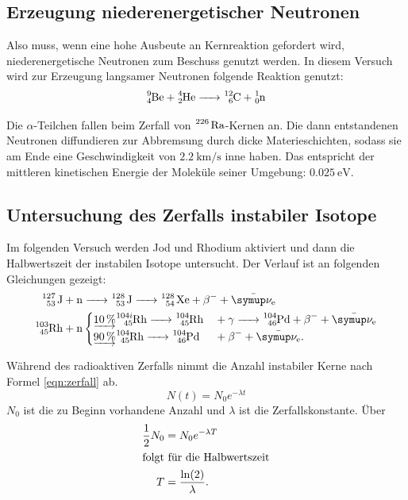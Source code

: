 \subsection{Erzeugung niederenergetischer Neutronen}

Also muss, wenn eine hohe Ausbeute an Kernreaktion gefordert wird, niederenergetische
Neutronen zum Beschuss genutzt werden.
In diesem Versuch wird zur Erzeugung langsamer Neutronen folgende Reaktion
genutzt:
\begin{equation*}
  \ce{^9_4Be + ^4_2He -> ^12_6C + ^1_0n}
\end{equation*}

Die $\alpha$-Teilchen fallen beim Zerfall von $\ce{^226 Ra}$-Kernen an.
Die dann entstandenen Neutronen diffundieren zur Abbremsung durch dicke
Materieschichten, sodass sie am Ende eine Geschwindigkeit von $\SI{2.2}{\kilo\meter\per\second}$
inne haben. Das entspricht der mittleren kinetischen Energie der Moleküle
seiner Umgebung: $\SI{0.025}{\electronvolt}$.

\subsection{Untersuchung des Zerfalls instabiler Isotope}

Im folgenden Versuch werden Jod und Rhodium aktiviert und dann die Halbwertszeit
der instabilen Isotope untersucht. Der Verlauf ist an folgenden Gleichungen
gezeigt:
\begin{align}
  \ce{^127_53 J + n&-> ^128_53 J -> ^128_54 Xe + \beta^- + \bar{\g{\nu}_e}}\\
  \ce{^103_45Rh + n&}
  \begin{cases}
    \underrightarrow{\SI{10}{\percent}} \ce{^{104i}_45Rh -> ^104_45Rh &+ \text{$\gamma$} -> ^104_46Pd + \beta^- + \bar{\g{\nu}_e}}\\
    \underrightarrow{\SI{90}{\percent}} \ce{^104_45Rh -> ^104_46Pd &+ \beta^- + \bar{\g{\nu}_e}}.
  \end{cases}\label{eqn:zerfrho}
\end{align}

Während des radioaktiven Zerfalls nimmt die Anzahl instabiler Kerne nach
Formel \eqref{eqn:zerfall} ab.
\begin{equation}
  N(t) = N_0 e^{-\lambda t}
  \label{eqn:zerfall}
\end{equation}
$N_0$ ist die zu Beginn vorhandene Anzahl und $\lambda$ ist die Zerfallskonstante.
Über
\begin{align}
  \frac{1}{2} N_0 &= N_0 e^{-\lambda T}\\
  \intertext{folgt für die Halbwertszeit}
  T &= \frac{\ln(2)}{\lambda}.
  \label{eqn:HalbwertszeitSteigung}
\end{align}

